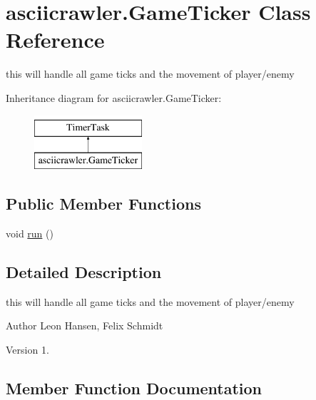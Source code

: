 \hypertarget{classasciicrawler_1_1GameTicker}{}\section{asciicrawler.\+Game\+Ticker Class Reference}
\label{classasciicrawler_1_1GameTicker}


this will handle all game ticks and the movement of player/enemy  


Inheritance diagram for asciicrawler.\+Game\+Ticker\+:\begin{figure}[H]
\begin{center}
\leavevmode
\includegraphics[height=2.000000cm]{classasciicrawler_1_1GameTicker}
\end{center}
\end{figure}
\subsection*{Public Member Functions}
\begin{DoxyCompactItemize}
\item 
void \hyperlink{classasciicrawler_1_1GameTicker_ace7f637461d8fde2033d01a2fc769275}{run} ()
\end{DoxyCompactItemize}


\subsection{Detailed Description}
this will handle all game ticks and the movement of player/enemy 

\begin{DoxyAuthor}{Author}
Leon Hansen, Felix Schmidt 
\end{DoxyAuthor}
\begin{DoxyVersion}{Version}
1. 
\end{DoxyVersion}


\subsection{Member Function Documentation}
\mbox{\label{classasciicrawler_1_1GameTicker_ace7f637461d8fde2033d01a2fc769275}} 
